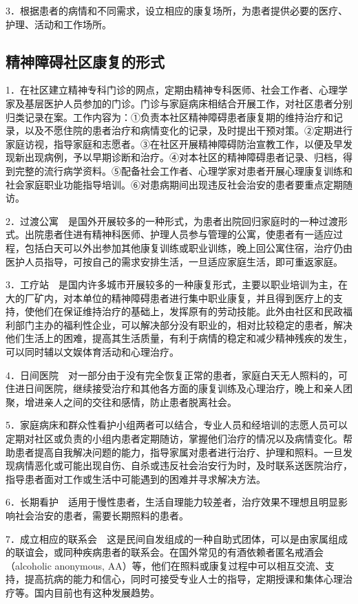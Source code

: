 3．根据患者的病情和不同需求，设立相应的康复场所，为患者提供必要的医疗、护理、活动和工作场所。

\subsection{精神障碍社区康复的形式}

1．在社区建立精神专科门诊的网点，定期由精神专科医师、社会工作者、心理学家及基层医护人员参加的门诊。门诊与家庭病床相结合开展工作，对社区患者分别归类记录在案。工作内容为：①负责本社区精神障碍患者康复期的维持治疗和记录，以及不愿住院的患者治疗和病情变化的记录，及时提出干预对策。②定期进行家庭访视，指导家庭和志愿者。③在社区开展精神障碍防治宣教工作，以便及早发现新出现病例，予以早期诊断和治疗。④对本社区的精神障碍患者记录、归档，得到完整的流行病学资料。⑤配备社会工作者、心理学家对患者开展心理康复训练和社会家庭职业功能指导培训。⑥对患病期间出现违反社会治安的患者要重点定期随访。

2．过渡公寓　是国外开展较多的一种形式，为患者出院回归家庭时的一种过渡形式。出院患者住进有精神科医师、护理人员参与管理的公寓，使患者有一适应过程，包括白天可以外出参加其他康复训练或职业训练，晚上回公寓住宿，治疗仍由医护人员指导，可按自己的需求安排生活，一旦适应家庭生活，即可重返家庭。

3．工疗站　是国内许多城市开展较多的一种康复形式，主要以职业培训为主，在大的厂矿内，对本单位的精神障碍患者进行集中职业康复，并且得到医疗上的支持，使他们在保证维持治疗的基础上，发挥原有的劳动技能。此外由社区和民政福利部门主办的福利性企业，可以解决部分没有职业的，相对比较稳定的患者，解决他们生活上的困难，提高其生活质量，有利于病情的稳定和减少精神残疾的发生，可以同时辅以文娱体育活动和心理治疗。

4．日间医院　对一部分由于没有完全恢复正常的患者，家庭白天无人照料的，可住进日间医院，继续接受治疗和其他各方面的康复训练及心理治疗，晚上和亲人团聚，增进亲人之间的交往和感情，防止患者脱离社会。

5．家庭病床和群众性看护小组两者可以结合，专业人员和经培训的志愿人员可以定期对社区或负责的小组内患者定期随访，掌握他们治疗的情况以及病情变化。帮助患者提高自我解决问题的能力，指导家属对患者进行治疗、护理和照料。一旦发现病情恶化或可能出现自伤、自杀或违反社会治安行为时，及时联系送医院治疗，指导患者面对工作或生活中可能遇到的困难并寻求解决方法。

6．长期看护　适用于慢性患者，生活自理能力较差者，治疗效果不理想且明显影响社会治安的患者，需要长期照料的患者。

7．成立相应的联系会　这是民间自发组成的一种自助式团体，可以是由家属组成的联谊会，或同种疾病患者的联系会。在国外常见的有酒依赖者匿名戒酒会（alcoholic
anonymous,
AA）等，他们在照料或康复过程中可以相互交流、支持，提高抗病的能力和信心，同时可接受专业人士的指导，定期授课和集体心理治疗等。国内目前也有这种发展趋势。